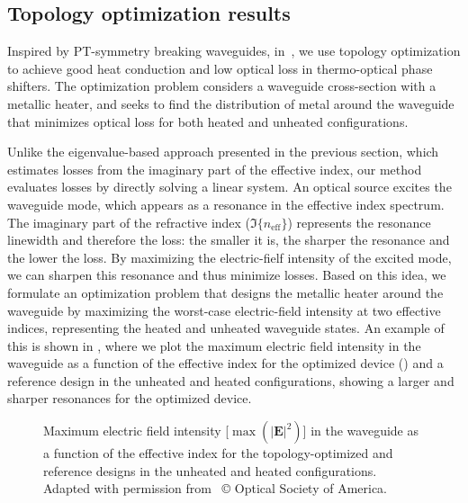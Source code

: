 \subsection*{Topology optimization results~\cite{ownpub0}}

Inspired by PT-symmetry breaking waveguides, in~\cite{ownpub0}, we use topology optimization to achieve good heat conduction and low optical loss in thermo-optical phase shifters.
The optimization problem considers a waveguide cross-section with a metallic heater, and seeks to find the distribution of metal around the waveguide that minimizes optical loss for both heated and 
unheated configurations. 

Unlike the eigenvalue-based approach presented in the previous section, which estimates losses from the imaginary part of the effective index,
 our method evaluates losses by directly solving a linear system. An optical source excites the waveguide mode, which appears
  as a resonance in the effective index spectrum. The imaginary part of the refractive index ($\Im\{n_\text{eff}\}$) represents the resonance linewidth and therefore the loss:
   the smaller it is, the sharper the resonance and the lower the loss. By maximizing the electric-fielf intensity of the excited mode,
    we can sharpen this resonance and thus minimize losses. Based on this idea, we formulate an optimization problem that designs
     the metallic heater around the waveguide by maximizing the worst-case electric-field intensity at two effective indices, representing
      the heated and unheated waveguide states. An example of this is shown in , where we plot the maximum electric field intensity in the waveguide as a function of 
      the effective index for the optimized device () and a reference design in the unheated and heated configurations, showing a larger and sharper resonances 
      for the optimized device.
 
      \begin{figure}[b]
         \centering
         \caption{Maximum electric field intensity [$\max(\vert \mathbf{E} \vert^2)$] in the waveguide as a function of the effective index for the topology-optimized and reference designs in the unheated and heated
         configurations. Adapted with permission from~\cite{ownpub0} © Optical Society of America.}
         \label{fig:therm_opt_neff}
      \end{figure}
      

